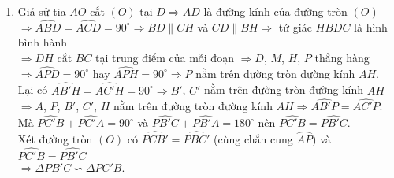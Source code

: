 \begin{bt}
{\begin{enumerate}
\item Giả sử tia $AO$ cắt $(O)$ tại $D\Rightarrow AD$ là đường kính của đường tròn $(O)$\\
$\Rightarrow \widehat{ABD}=\widehat{ACD}=90^{\circ}\Rightarrow BD\parallel CH$ và $CD\parallel BH\Rightarrow$ tứ giác $HBDC$ là hình bình hành\\
$\Rightarrow DH$ cắt $BC$ tại trung điểm của mỗi đoạn $\Rightarrow D$, $M$, $H$, $P$ thẳng hàng\\
$\Rightarrow \widehat{APD}=90^{\circ}$ hay $\widehat{APH}=90^{\circ}\Rightarrow P$ nằm trên đường tròn đường kính $AH$.\\
Lại có $\widehat{AB'H}=\widehat{AC'H}=90^{\circ}\Rightarrow B'$, $C'$ nằm trên đường tròn đường kính $AH$\\
$\Rightarrow A$, $P$, $B'$, $C'$, $H$ nằm trên đường tròn đường kính $AH\Rightarrow \widehat{AB'P}=\widehat{AC'P}$.\\
Mà $\widehat{PC'B}+\widehat{PC'A}=90^{\circ}$ và $\widehat{PB'C}+\widehat{PB'A}=180^{\circ}$ nên $\widehat{PC'B}=\widehat{PB'C}$.\\
Xét đường tròn $(O)$ có $\widehat{PCB'}=\widehat{PBC'}$ (cùng chắn cung $\wideparen{AP}$) và $\widehat{PC'B}=\widehat{PB'C}$\\
$\Rightarrow \Delta PB'C\backsim\Delta PC'B$.


\end{enumerate}}
\end{bt}

